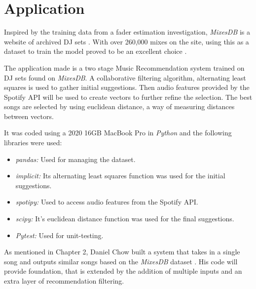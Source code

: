 
\graphicspath{{Chapter5/}}



\chapter{Application}

Inspired by the training data from a fader estimation investigation, \textit{MixesDB} is a website of archived DJ sets \citep{kim_automatic_2017}. With over 260,000 mixes on the site, using this as a dataset to train the model proved to be an excellent choice \citep{mixesdb_main_2023}.
 
 The application made is a two stage Music Recommendation system trained on DJ sets found on \textit{MixesDB}. A collaborative filtering algorithm, alternating least squares is used to gather initial suggestions. Then audio features provided by the Spotify API will be used to create vectors to further refine the selection. The best songs are selected by using euclidean distance, a way of measuring distances between vectors. 
 
 It was coded using a 2020 16GB MacBook Pro in \textit{Python} and the following libraries were used:
 \begin{itemize}
 	\item \textit{pandas:} Used for managing the dataset.
 	\item \textit{implicit:} Its alternating least squares function was used for the initial suggestions.
 	\item \textit{spotipy:} Used to access audio features from the Spotify API.
 	\item \textit{scipy:} It's euclidean distance function was used for the final suggestions.
 	\item \textit{Pytest:} Used for unit-testing.
	\end{itemize}
 
 As mentioned in Chapter 2, Daniel Chow built a system that takes in a single song and outputs similar songs based on the \textit{MixesDB} dataset \citep{chow_music_2020}. His code will provide foundation, that is extended by the addition of multiple inputs and an extra layer of recommendation filtering.

